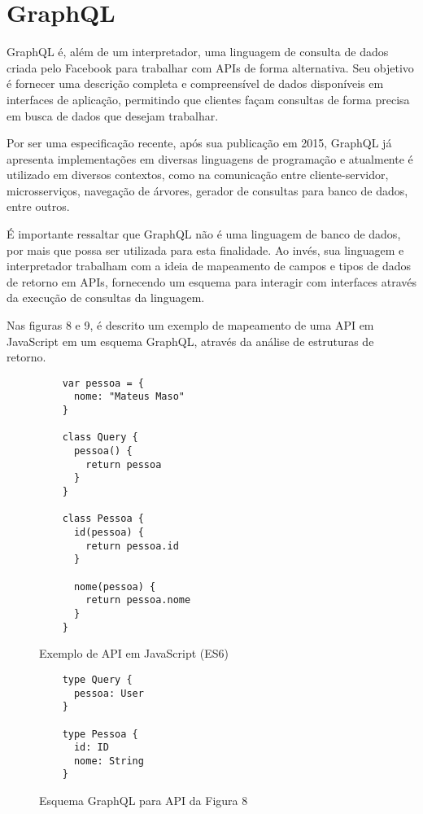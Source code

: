 \chapter{GraphQL}

GraphQL é, além de um interpretador, uma linguagem de consulta de dados criada pelo Facebook para trabalhar com APIs de forma alternativa. Seu objetivo é fornecer uma descrição completa e compreensível de dados disponíveis em interfaces de aplicação, permitindo que clientes façam consultas de forma precisa em busca de dados que desejam trabalhar. \cite{Facebook2016}

Por ser uma especificação recente, após sua publicação em 2015, GraphQL já apresenta implementações em diversas linguagens de programação e atualmente é utilizado em diversos contextos, como na comunicação entre cliente-servidor, microsserviços, navegação de árvores, gerador de consultas para banco de dados, entre outros.

É importante ressaltar que GraphQL não é uma linguagem de banco de dados, por mais que possa ser utilizada para esta finalidade. Ao invés, sua linguagem e interpretador trabalham com a ideia de mapeamento de campos e tipos de dados de retorno em APIs, fornecendo um esquema para interagir com interfaces através da execução de consultas da linguagem. \cite{Facebook2016}

Nas figuras 8 e 9, é descrito um exemplo de mapeamento de uma API em JavaScript em um esquema GraphQL, através da análise de estruturas de retorno.

\begin{figure}[H]
  \centering
  \begin{verbatim}
    var pessoa = {
      nome: "Mateus Maso"
    }

    class Query {
      pessoa() {
        return pessoa
      }
    }

    class Pessoa {
      id(pessoa) {
        return pessoa.id
      }

      nome(pessoa) {
        return pessoa.nome
      }
    }
  \end{verbatim}
  \caption{Exemplo de API em JavaScript (ES6)}
\end{figure}

\begin{figure}[H]
  \centering
  \begin{verbatim}
    type Query {
      pessoa: User
    }

    type Pessoa {
      id: ID
      nome: String
    }
  \end{verbatim}
  \caption{Esquema GraphQL para API da Figura 8}
\end{figure}

